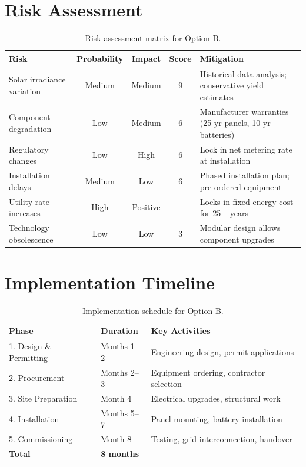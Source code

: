 \documentclass[
    language=english,
    doctype=feasibility-study,
    institution=none,
]{../../omnilatex}
\begin{document}
\section{Risk Assessment}

\begin{table}[h]
    \centering
    \begin{tabular}{p{3cm}cccp{4cm}}
        \toprule
        \textbf{Risk} & \textbf{Probability} & \textbf{Impact} & \textbf{Score} & \textbf{Mitigation} \\
        \midrule
        Solar irradiance variation & Medium & Medium & 9 & Historical data analysis; conservative yield estimates \\
        Component degradation & Low & Medium & 6 & Manufacturer warranties (25-yr panels, 10-yr batteries) \\
        Regulatory changes & Low & High & 6 & Lock in net metering rate at installation \\
        Installation delays & Medium & Low & 6 & Phased installation plan; pre-ordered equipment \\
        Utility rate increases & High & Positive & -- & Locks in fixed energy cost for 25+ years \\
        Technology obsolescence & Low & Low & 3 & Modular design allows component upgrades \\
        \bottomrule
    \end{tabular}
    \caption{Risk assessment matrix for Option B.}
\end{table}

\section{Implementation Timeline}

\begin{table}[h]
    \centering
    \begin{tabular}{lll}
        \toprule
        \textbf{Phase} & \textbf{Duration} & \textbf{Key Activities} \\
        \midrule
        1. Design \& Permitting & Months 1--2 & Engineering design, permit applications \\
        2. Procurement & Months 2--3 & Equipment ordering, contractor selection \\
        3. Site Preparation & Month 4 & Electrical upgrades, structural work \\
        4. Installation & Months 5--7 & Panel mounting, battery installation \\
        5. Commissioning & Month 8 & Testing, grid interconnection, handover \\
        \midrule
        \textbf{Total} & \textbf{8 months} & \\
        \bottomrule
    \end{tabular}
    \caption{Implementation schedule for Option B.}
\end{table}
\end{document}
